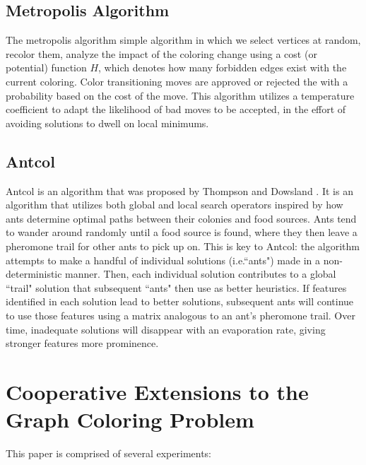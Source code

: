 \documentclass[runningheads]{llncs}
\begin{document}
\subsection{Metropolis Algorithm}
The metropolis algorithm simple algorithm in which we select vertices at random, recolor them, analyze the impact of the coloring change using a cost (or potential) function $H$, which denotes how many forbidden edges exist with the current coloring. Color transitioning moves are approved or rejected the with a probability based on the cost of the move. This algorithm utilizes a temperature coefficient to adapt the likelihood of bad moves to be accepted, in the effort of avoiding solutions to dwell on local minimums.

\subsection{Antcol}

Antcol is an algorithm that was proposed by Thompson and Dowsland \cite{ant_kj}. It is an algorithm that utilizes both global and local search operators inspired by how ants determine optimal paths between their colonies and food sources. Ants tend to wander around randomly until a food source is found, where they then leave a pheromone trail for other ants to pick up on. This is key to Antcol: the algorithm attempts to make a handful of individual solutions (i.e.``ants") made in a non-deterministic manner. Then, each individual solution contributes to a global ``trail" solution that subsequent ``ants" then use as better heuristics. If features identified in each solution lead to better solutions, subsequent ants will continue to use those features using a matrix analogous to an ant's pheromone trail. Over time, inadequate solutions will disappear with an evaporation rate, giving stronger features more prominence.

\section{Cooperative Extensions to the Graph Coloring Problem}

This paper is comprised of several experiments:
\end{document}
